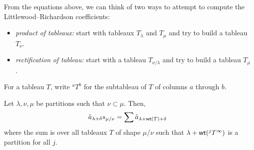 From the equations above, we can think of two ways to attempt to compute the Littlewood--Richardson coefficients:
\begin{itemize}
    \item \emph{product of tableaux:} start with tableaux \(T_\lambda\) and \(T_\mu\) and try to build a tableau \(T_\nu\). 
    \item \emph{rectification of tableau:} start with a tableau \(T_{\nu / \lambda}\) and try to build a tableau \(T_\mu\).
\end{itemize}

For a tableau \(T\),
write \(^aT^b\) for the subtableau of \(T\) of columns \(a\) through \(b\).

\begin{theorem} \label{thm:skew-tilde-a}
    Let \(\lambda, \nu, \mu\) be partitions such that \(\nu \subset \mu\).
    Then,
    \begin{equation}
        \tilde{a}_{\lambda + \delta} s_{\mu/\nu}
        =
        \sum \tilde{a}_{\lambda + \operatorname{\mathsf{wt}}(T) + \delta}
    \end{equation}
    where the sum is over all tableaux \(T\) of shape \(\mu/\nu\)
    such that \(\lambda + \operatorname{\mathsf{wt}}(^jT^\infty)\) is a partition for all \(j\).
\end{theorem}

